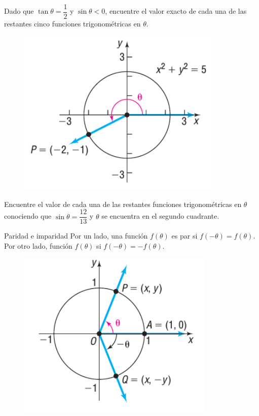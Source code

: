 {}
	

{}
	\begin{problema}
		Dado que $\tan\theta=\dfrac{1}{2}$ y $\sin\theta<0$, encuentre el valor exacto de cada una de las restantes cinco funciones trigonométricas en $\theta$.
	\end{problema}
	

{}
	\begin{figure}[h]
		\centering
		\includegraphics[height=8cm]{./trig/sull0642.png}
		\label{fig:0642}
	\end{figure}
	

{}
	\begin{problema}
		Encuentre el valor de cada una de las restantes funciones trigonométricas en $\theta$ conociendo que $\sin\theta=\dfrac{12}{13}$ y $\theta$ se encuentra en el segundo cuadrante.
	\end{problema}
	

{Paridad e imparidad}
	Por un lado, una función $f(\theta)$ es par si $f(-\theta)=f(\theta).$  Por otro lado, función $f(\theta)$ si $f(-\theta)=-f(\theta).$

{}
	\begin{figure}[h]
		\centering
		\includegraphics[height=8cm,keepaspectratio=true]{./trig/sull0443.png}
		\label{fig:0643}
	\end{figure}
	


